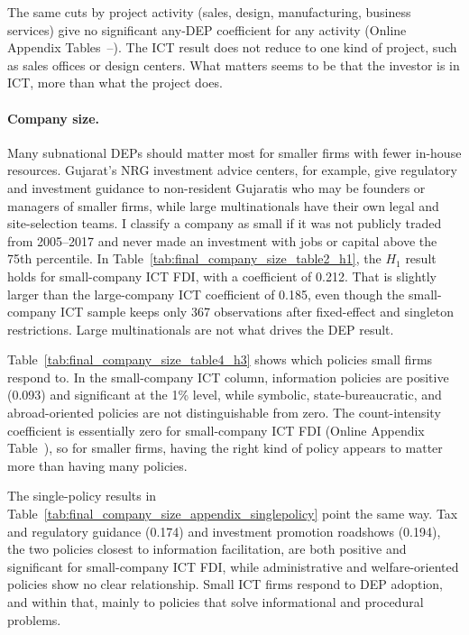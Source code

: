 \documentclass[12pt]{article}
\begin{document}
The same cuts by project activity (sales, design, manufacturing, business services) give no significant any-DEP coefficient for any activity (Online Appendix Tables~--). The ICT result does not reduce to one kind of project, such as sales offices or design centers. What matters seems to be that the investor is in ICT, more than what the project does.



\paragraph{Company size.} Many subnational DEPs should matter most for smaller firms with fewer in-house resources. Gujarat's NRG investment advice centers, for example, give regulatory and investment guidance to non-resident Gujaratis who may be founders or managers of smaller firms, while large multinationals have their own legal and site-selection teams. I classify a company as small if it was not publicly traded from 2005--2017 and never made an investment with jobs or capital above the 75th percentile. In Table~\ref{tab:final_company_size_table2_h1}, the $H_1$ result holds for small-company ICT FDI, with a coefficient of 0.212. That is slightly larger than the large-company ICT coefficient of 0.185, even though the small-company ICT sample keeps only 367 observations after fixed-effect and singleton restrictions. Large multinationals are not what drives the DEP result.



Table~\ref{tab:final_company_size_table4_h3} shows which policies small firms respond to. In the small-company ICT column, information policies are positive (0.093) and significant at the 1\% level, while symbolic, state-bureaucratic, and abroad-oriented policies are not distinguishable from zero. The count-intensity coefficient is essentially zero for small-company ICT FDI (Online Appendix Table~), so for smaller firms, having the right kind of policy appears to matter more than having many policies.



The single-policy results in Table~\ref{tab:final_company_size_appendix_singlepolicy} point the same way. Tax and regulatory guidance (0.174) and investment promotion roadshows (0.194), the two policies closest to information facilitation, are both positive and significant for small-company ICT FDI, while administrative and welfare-oriented policies show no clear relationship. Small ICT firms respond to DEP adoption, and within that, mainly to policies that solve informational and procedural problems.
\end{document}
